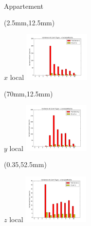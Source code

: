 \documentclass[10pt]{beamer}
\begin{document}
	\begin{frame}{Appartement}

		\begin{textblock*}{60mm}(2.5mm,12.5mm)
			\begin{block}{$x$ local}
				\includegraphics[width=125px]{../src/data/itinary_1/var_ecart_sat_x1.png}
			\end{block}
		\end{textblock*}

		\begin{textblock*}{60mm}(70mm,12.5mm)
			\begin{block}{$y$ local}
				\includegraphics[width=125px]{../src/data/itinary_1/var_ecart_sat_y1.png}
			\end{block}
		\end{textblock*}

		\begin{textblock*}{60mm}(0.35\textwidth,52.5mm)
			\begin{block}{$z$ local}
				\includegraphics[width=125px]{../src/data/itinary_1/var_ecart_sat_z1.png}
			\end{block}
		\end{textblock*}
	\end{frame}
\end{document}
